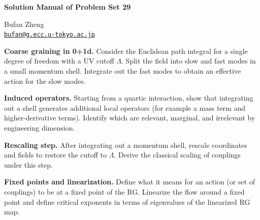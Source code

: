 \resetproblem
\begin{center}
    {\LARGE \textbf{Solution Manual of Problem Set 29} \par}
    \vspace{1em}
    {\large Bufan Zheng\\ \href{mailto:bufan@g.ecc.u-tokyo.ac.jp}{\texttt{bufan@g.ecc.u-tokyo.ac.jp}} \par}
\end{center}

\begin{problem}
    \textbf{Coarse graining in 0+1d.} Consider the Euclidean path integral for a single degree of freedom with a UV cutoff \(\Lambda\). Split the field into slow and fast modes in a small momentum shell. Integrate out the fast modes to obtain an effective action for the slow modes.
\end{problem}
\begin{problem}
    \textbf{Induced operators.} Starting from a quartic interaction, show that integrating out a shell generates additional local operators (for example a mass term and higher-derivative terms). Identify which are relevant, marginal, and irrelevant by engineering dimension.
\end{problem}
\begin{problem}
    \textbf{Rescaling step.} After integrating out a momentum shell, rescale coordinates and fields to restore the cutoff to \(\Lambda\). Derive the classical scaling of couplings under this step.
\end{problem}
\begin{problem}
    \textbf{Fixed points and linearization.} Define what it means for an action (or set of couplings) to be at a fixed point of the RG. Linearize the flow around a fixed point and define critical exponents in terms of eigenvalues of the linearized RG map.
\end{problem}

